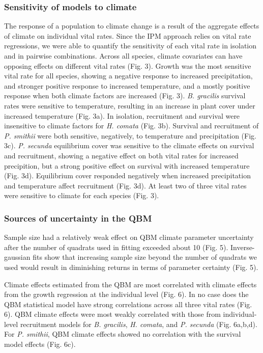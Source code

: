 \documentclass[12pt,]{article}
\begin{document}
\subsubsection{Sensitivity of models to
climate}\label{sensitivity-of-models-to-climate}

The response of a population to climate change is a result of the
aggregate effects of climate on individual vital rates. Since the IPM
approach relies on vital rate regressions, we were able to quantify the
sensitivity of each vital rate in isolation and in pairwise
combinations. Across all species, climate covariates can have opposing
effects on different vital rates (Fig. 3). Growth was the most sensitive
vital rate for all species, showing a negative response to increased
precipitation, and stronger positive response to increased temperature,
and a mostly positive response when both climate factors are increased
(Fig. 3). \emph{B. gracilis} survival rates were sensitive to
temperature, resulting in an increase in plant cover under increased
temperature (Fig. 3a). In isolation, recruitment and survival were
insensitive to climate factors for \emph{H. comata} (Fig. 3b). Survival
and recruitment of \emph{P. smithii} were both sensitive, negatively, to
temperature and precipitation (Fig. 3c). \emph{P. secunda} equilibrium
cover was sensitive to the climate effects on survival and recruitment,
showing a negative effect on both vital rates for increased precipition,
but a strong positive effect on survival with increased temperature
(Fig. 3d). Equilibrium cover responded negatively when increased
precipitation and temperature affect recruitment (Fig. 3d). At least two
of three vital rates were sensitive to climate for each species (Fig.
3).

\subsubsection{Sources of uncertainty in the
QBM}\label{sources-of-uncertainty-in-the-qbm}

Sample size had a relatively weak effect on QBM climate parameter
uncertainty after the number of quadrats used in fitting exceeded about
10 (Fig. 5). Inverse-gaussian fits show that increasing sample size
beyond the number of quadrats we used would result in diminishing
returns in terms of parameter certainty (Fig. 5).

Climate effects estimated from the QBM are most correlated with climate
effects from the growth regression at the individual level (Fig. 6). In
no case does the QBM statistical model have strong correlations across
all three vital rates (Fig. 6). QBM climate effects were most weakly
correlated with those from individual-level recruitment models for
\emph{B. gracilis}, \emph{H. comata}, and \emph{P. secunda} (Fig.
6a,b,d). For \emph{P. smithii}, QBM climate effects showed no
correlation with the survival model effects (Fig. 6c).
\end{document}
